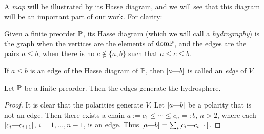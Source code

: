 \par A \textit{map} will be illustrated by its Hasse diagram, and we will see that this diagram will be an important part of our work. For clarity:
\begin{definition}
	Given a finite preorder $\mathbb{P}$, its Hasse diagram (which we will call a \textit{hydrography}) is the graph when the vertices are the elements of $\text{dom} \mathbb{P}$, and the edges are the pairs $a \leq b$, when there is no $c \notin \{a, b\}$ such that $a \leq c \leq b$.
\end{definition}
	If $a \leq b$ is an edge of the Hasse diagram of $\mathbb{P}$, then $[a \connect b]$ is called an \textit{edge} of $V$.
\begin{prop}
	Let $\mathbb{P}$ be a finite preorder. Then the edges generate the hydrosphere.
\end{prop}
\begin{proof}
	It is clear that the polarities generate $V$. Let $[a \connect b]$ be a polarity that is not an edge. Then there exists a chain $a := c_1 \leq  \cdots \leq c_n =: b$, $n > 2$, where each $[c_i \connect c_{i+1}]$, $i = 1, \dots, n-1$, is an edge. Thus $[a \connect b] = \sum_i [c_i \connect c_{i+1}]$.
\end{proof}
